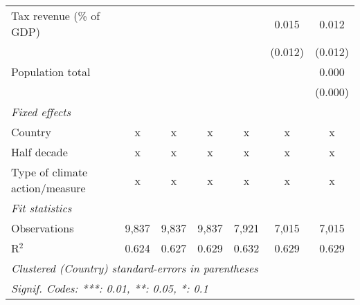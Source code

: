 \begin{tabular}{lcccccc}
   Tax revenue (\% of GDP)                                                                         &         &               &                &                & 0.015          & 0.012\\   
                                                                                                   &         &               &                &                & (0.012)        & (0.012)\\   
   Population total                                                                                &         &               &                &                &                & 0.000\\   
                                                                                                   &         &               &                &                &                & (0.000)\\   
   \emph{Fixed effects}\\
   Country                                                                                         & x       & x             & x              & x              & x              & x\\  
   Half decade                                                                                     & x       & x             & x              & x              & x              & x\\  
   Type of climate action/measure                                                                  & x       & x             & x              & x              & x              & x\\  
   \midrule \emph{Fit statistics}\\
   Observations                                                                                    & 9,837   & 9,837         & 9,837          & 7,921          & 7,015          & 7,015\\  
   R$^2$                                                                                           & 0.624   & 0.627         & 0.629          & 0.632          & 0.629          & 0.629\\  
   \midrule
   \multicolumn{7}{l}{\emph{Clustered (Country) standard-errors in parentheses}}\\
   \multicolumn{7}{l}{\emph{Signif. Codes: ***: 0.01, **: 0.05, *: 0.1}}\\
\end{tabular}
\par\endgroup



